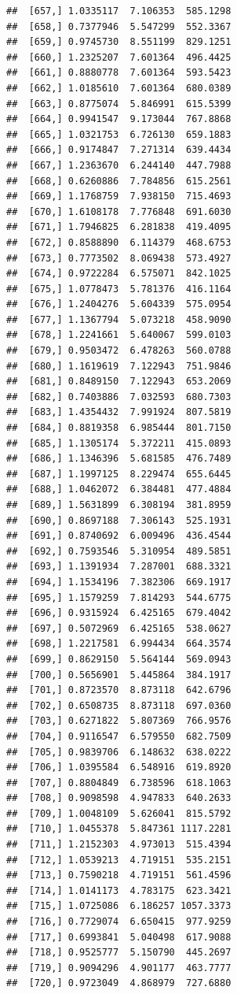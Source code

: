\documentclass[article]{jss}\usepackage[]{graphicx}\usepackage[]{xcolor}
\makeatletter
\newenvironment{kframe}{%
 \def\at@end@of@kframe{}%
 \ifinner\ifhmode%
  \def\at@end@of@kframe{\end{minipage}}%
  \begin{minipage}{\columnwidth}%
 \fi\fi%
 \def\FrameCommand##1{\hskip\@totalleftmargin \hskip-\fboxsep
 \colorbox{shadecolor}{##1}\hskip-\fboxsep
     \hskip-\linewidth \hskip-\@totalleftmargin \hskip\columnwidth}%
 \MakeFramed {\advance\hsize-\width
   \@totalleftmargin\z@ \linewidth\hsize
   \@setminipage}}%
 {\par\unskip\endMakeFramed%
 \at@end@of@kframe}
\newenvironment{knitrout}{}{} %
\makeatother
\begin{document}
\begin{knitrout}
\begin{kframe}
\begin{verbatim}
##  [657,] 1.0335117  7.106353  585.1298
##  [658,] 0.7377946  5.547299  552.3367
##  [659,] 0.9745730  8.551199  829.1251
##  [660,] 1.2325207  7.601364  496.4425
##  [661,] 0.8880778  7.601364  593.5423
##  [662,] 1.0185610  7.601364  680.0389
##  [663,] 0.8775074  5.846991  615.5399
##  [664,] 0.9941547  9.173044  767.8868
##  [665,] 1.0321753  6.726130  659.1883
##  [666,] 0.9174847  7.271314  639.4434
##  [667,] 1.2363670  6.244140  447.7988
##  [668,] 0.6260886  7.784856  615.2561
##  [669,] 1.1768759  7.938150  715.4693
##  [670,] 1.6108178  7.776848  691.6030
##  [671,] 1.7946825  6.281838  419.4095
##  [672,] 0.8588890  6.114379  468.6753
##  [673,] 0.7773502  8.069438  573.4927
##  [674,] 0.9722284  6.575071  842.1025
##  [675,] 1.0778473  5.781376  416.1164
##  [676,] 1.2404276  5.604339  575.0954
##  [677,] 1.1367794  5.073218  458.9090
##  [678,] 1.2241661  5.640067  599.0103
##  [679,] 0.9503472  6.478263  560.0788
##  [680,] 1.1619619  7.122943  751.9846
##  [681,] 0.8489150  7.122943  653.2069
##  [682,] 0.7403886  7.032593  680.7303
##  [683,] 1.4354432  7.991924  807.5819
##  [684,] 0.8819358  6.985444  801.7150
##  [685,] 1.1305174  5.372211  415.0893
##  [686,] 1.1346396  5.681585  476.7489
##  [687,] 1.1997125  8.229474  655.6445
##  [688,] 1.0462072  6.384481  477.4884
##  [689,] 1.5631899  6.308194  381.8959
##  [690,] 0.8697188  7.306143  525.1931
##  [691,] 0.8740692  6.009496  436.4544
##  [692,] 0.7593546  5.310954  489.5851
##  [693,] 1.1391934  7.287001  688.3321
##  [694,] 1.1534196  7.382306  669.1917
##  [695,] 1.1579259  7.814293  544.6775
##  [696,] 0.9315924  6.425165  679.4042
##  [697,] 0.5072969  6.425165  538.0627
##  [698,] 1.2217581  6.994434  664.3574
##  [699,] 0.8629150  5.564144  569.0943
##  [700,] 0.5656901  5.445864  384.1917
##  [701,] 0.8723570  8.873118  642.6796
##  [702,] 0.6508735  8.873118  697.0360
##  [703,] 0.6271822  5.807369  766.9576
##  [704,] 0.9116547  6.579550  682.7509
##  [705,] 0.9839706  6.148632  638.0222
##  [706,] 1.0395584  6.548916  619.8920
##  [707,] 0.8804849  6.738596  618.1063
##  [708,] 0.9098598  4.947833  640.2633
##  [709,] 1.0048109  5.626041  815.5792
##  [710,] 1.0455378  5.847361 1117.2281
##  [711,] 1.2152303  4.973013  515.4394
##  [712,] 1.0539213  4.719151  535.2151
##  [713,] 0.7590218  4.719151  561.4596
##  [714,] 1.0141173  4.783175  623.3421
##  [715,] 1.0725086  6.186257 1057.3373
##  [716,] 0.7729074  6.650415  977.9259
##  [717,] 0.6993841  5.040498  617.9088
##  [718,] 0.9525777  5.150790  445.2697
##  [719,] 0.9094296  4.901177  463.7777
##  [720,] 0.9723049  4.868979  727.6880

\end{verbatim}
\end{kframe}
\end{knitrout}
\end{document}
